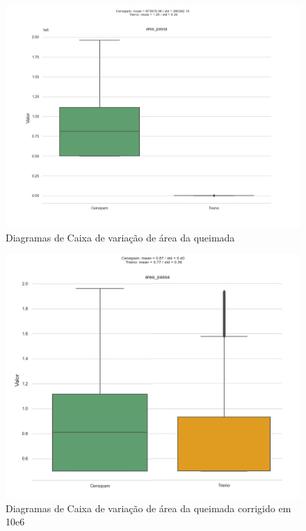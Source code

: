 \begin{figure}[H]
	\centering
	\begin{minipage}{0.98\linewidth}
		\centering
		\includegraphics[scale=0.6]{tg1/figuras/area2.png}
		\caption{Diagramas de Caixa de variação de área da queimada}
            \label{fig:area}
	\end{minipage}
\end{figure}


\begin{figure}[H]
	\centering
	\begin{minipage}{0.98\linewidth}
		\centering
		\includegraphics[scale=0.6]{tg1/figuras/corrigido.png}
		\caption{Diagramas de Caixa de variação de área da queimada corrigido em 10e6}
            \label{fig:corrigido}
	\end{minipage}
\end{figure}

